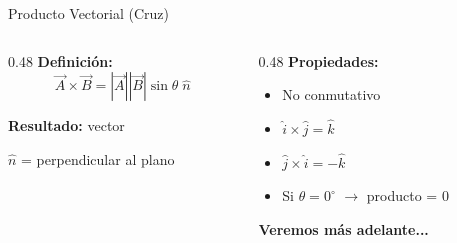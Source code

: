 \documentclass[aspectratio=169,xcolor=dvipsnames]{beamer}
\begin{document}
\begin{frame}{Producto Vectorial (Cruz)}
	\begin{columns}[T]
		\begin{column}{0.48\textwidth}
			\textbf{Definición:}
			\[
			\vec{A}\times\vec{B} = |\vec{A}||\vec{B}|\sin\theta\;\hat{n}
			\]
			
			\vspace{0.2cm}
			\textbf{Resultado:} \alert{vector}
			
			\vspace{0.2cm}
			$\hat{n}$ = perpendicular al plano
		\end{column}
		\begin{column}{0.48\textwidth}
			\textbf{Propiedades:}
			\begin{itemize}
				\item No conmutativo
				\item $\hat{i}\times\hat{j} = \hat{k}$
				\item $\hat{j}\times\hat{i} = -\hat{k}$
				\item Si $\theta=0^\circ$ $\rightarrow$ producto = 0
			\end{itemize}
			
			\vspace{0.2cm}
			\textbf{Veremos más adelante...}
		\end{column}
	\end{columns}
\end{frame}
\end{document}
